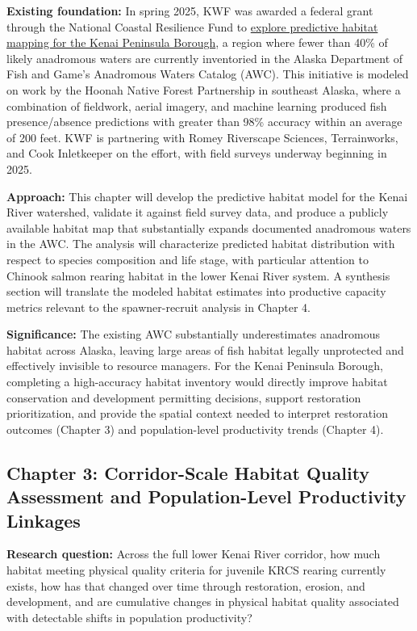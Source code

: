 \documentclass[
  letterpaper,
  DIV=11,
  numbers=noendperiod]{scrreprt}
\begin{document}
\textbf{Existing foundation:} In spring 2025, KWF was awarded a federal
grant through the National Coastal Resilience Fund to
\href{https://www.kenaiwatershed.org/news-media/fish-habitat-mapping-2025/}{explore
predictive habitat mapping for the Kenai Peninsula Borough}, a region
where fewer than 40\% of likely anadromous waters are currently
inventoried in the Alaska Department of Fish and Game's Anadromous
Waters Catalog (AWC). This initiative is modeled on work by the Hoonah
Native Forest Partnership in southeast Alaska, where a combination of
fieldwork, aerial imagery, and machine learning produced fish
presence/absence predictions with greater than 98\% accuracy within an
average of 200 feet. KWF is partnering with Romey Riverscape Sciences,
Terrainworks, and Cook Inletkeeper on the effort, with field surveys
underway beginning in 2025.

\textbf{Approach:} This chapter will develop the predictive habitat
model for the Kenai River watershed, validate it against field survey
data, and produce a publicly available habitat map that substantially
expands documented anadromous waters in the AWC. The analysis will
characterize predicted habitat distribution with respect to species
composition and life stage, with particular attention to Chinook salmon
rearing habitat in the lower Kenai River system. A synthesis section
will translate the modeled habitat estimates into productive capacity
metrics relevant to the spawner-recruit analysis in Chapter 4.

\textbf{Significance:} The existing AWC substantially underestimates
anadromous habitat across Alaska, leaving large areas of fish habitat
legally unprotected and effectively invisible to resource managers. For
the Kenai Peninsula Borough, completing a high-accuracy habitat
inventory would directly improve habitat conservation and development
permitting decisions, support restoration prioritization, and provide
the spatial context needed to interpret restoration outcomes (Chapter 3)
and population-level productivity trends (Chapter 4).

\subsection{Chapter 3: Corridor-Scale Habitat Quality Assessment and
Population-Level Productivity
Linkages}\label{chapter-3-corridor-scale-habitat-quality-assessment-and-population-level-productivity-linkages}

\textbf{Research question:} Across the full lower Kenai River corridor,
how much habitat meeting physical quality criteria for juvenile KRCS
rearing currently exists, how has that changed over time through
restoration, erosion, and development, and are cumulative changes in
physical habitat quality associated with detectable shifts in population
productivity?
\end{document}
